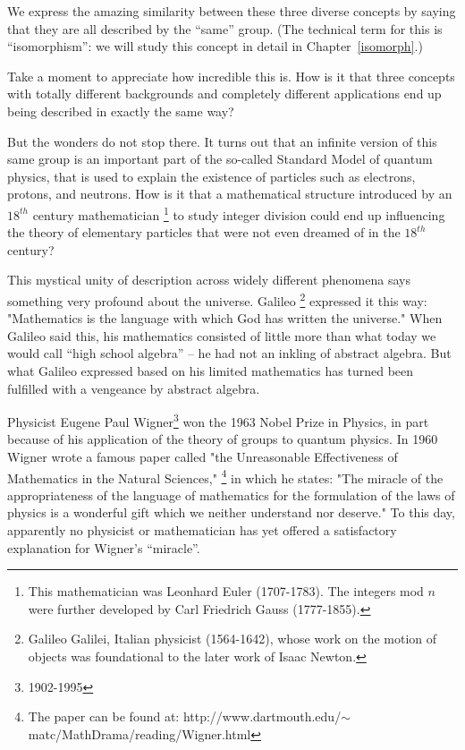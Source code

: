 We express the amazing similarity between these three diverse concepts by saying that they are all described by the ``same'' group. (The technical term for this is ``isomorphism'': we will study this concept in detail in Chapter~\ref{isomorph}.)

Take a moment to appreciate how incredible this is. How is it that three concepts with totally different backgrounds and completely different applications end up being described in exactly the same way?

But the wonders do not stop there. It turns out that an infinite version of this same group is an important part of the so-called Standard Model of quantum physics, that is used to explain the existence of particles such as electrons, protons, and neutrons. How is it that a mathematical structure introduced by an $18^{th}$ century mathematician
\footnote{This mathematician was Leonhard Euler (1707-1783). The integers mod $n$ were further developed by Carl Friedrich Gauss (1777-1855).}
 to study integer division could end up influencing the theory of elementary particles that were not even dreamed of in the $18^{th}$ century?

This mystical unity of description across widely different phenomena says something very profound about the universe. Galileo
\footnote{Galileo Galilei, Italian physicist (1564-1642), whose work on the motion of objects was foundational to the later work of Isaac Newton.}
 expressed it this way: "Mathematics is the language with which God has written the universe." When Galileo said this, his mathematics consisted of little more than what today we would call ``high school algebra'' -- he had not an inkling of abstract algebra. But what Galileo expressed based on his limited mathematics has turned been fulfilled with a vengeance by abstract algebra.
 
Physicist Eugene Paul Wigner\footnote{1902-1995} won the 1963 Nobel Prize in Physics, in part because of his application of the theory of groups to quantum physics. In 1960 Wigner wrote a famous paper called "the Unreasonable Effectiveness of Mathematics in the Natural Sciences,"
\footnote{The paper can be found at:  http://www.dartmouth.edu/$\sim$matc/MathDrama/reading/Wigner.html}
 in which he states: "The miracle of the appropriateness of the language of mathematics for the formulation of the laws of physics is a wonderful gift which we neither understand nor deserve." To this day, apparently no physicist or mathematician has yet offered a satisfactory explanation for Wigner's ``miracle''.

